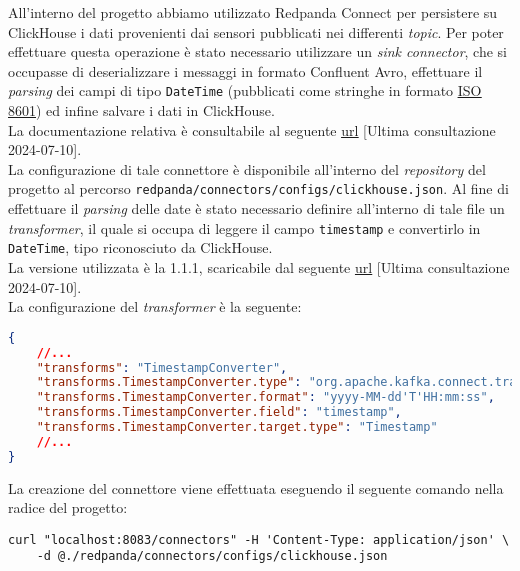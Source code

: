 All'interno del progetto abbiamo utilizzato Redpanda Connect per persistere su ClickHouse i dati provenienti dai sensori pubblicati nei differenti \textit{topic}. Per
poter effettuare questa operazione è stato necessario utilizzare un \textit{sink connector}, che si occupasse di deserializzare i messaggi in formato Confluent Avro, effettuare
il \textit{parsing} dei campi di tipo \texttt{DateTime} (pubblicati come stringhe in formato \href{https://www.iso.org/iso-8601-date-and-time-format.html}{\underline{ISO 8601}})
ed infine salvare i dati in ClickHouse.\\
La documentazione relativa è consultabile al seguente \href{https://clickhouse.com/docs/en/integrations/kafka/clickhouse-kafka-connect-sink}{\underline{url}}
[Ultima consultazione 2024-07-10].\\
La configurazione di tale connettore è disponibile all'interno del \textit{repository} del progetto al percorso \texttt{redpanda/connectors/configs/clickhouse.json}.
Al fine di effettuare il \textit{parsing} delle date è stato necessario definire all'interno di tale file un \textit{transformer}, il quale si occupa di leggere il campo \texttt{timestamp}
e convertirlo in \texttt{DateTime}, tipo riconosciuto da ClickHouse.\\
La versione utilizzata è la 1.1.1, scaricabile dal seguente \href{https://github.com/ClickHouse/clickhouse-kafka-connect/releases}{\underline{url}} [Ultima consultazione 2024-07-10].\\
La configurazione del \textit{transformer} è la seguente:
\begin{lstlisting}[language=json, caption=Configurazione del \textit{transformer} all'interno del file \texttt{clickhouse.json},captionpos=b]
{
    //...
    "transforms": "TimestampConverter",
    "transforms.TimestampConverter.type": "org.apache.kafka.connect.transforms.TimestampConverter$Value",
    "transforms.TimestampConverter.format": "yyyy-MM-dd'T'HH:mm:ss",
    "transforms.TimestampConverter.field": "timestamp",
    "transforms.TimestampConverter.target.type": "Timestamp"
    //...
}
\end{lstlisting}
La creazione del connettore viene effettuata eseguendo il seguente comando nella radice del progetto:
\begin{verbatim}
curl "localhost:8083/connectors" -H 'Content-Type: application/json' \
    -d @./redpanda/connectors/configs/clickhouse.json
\end{verbatim}

